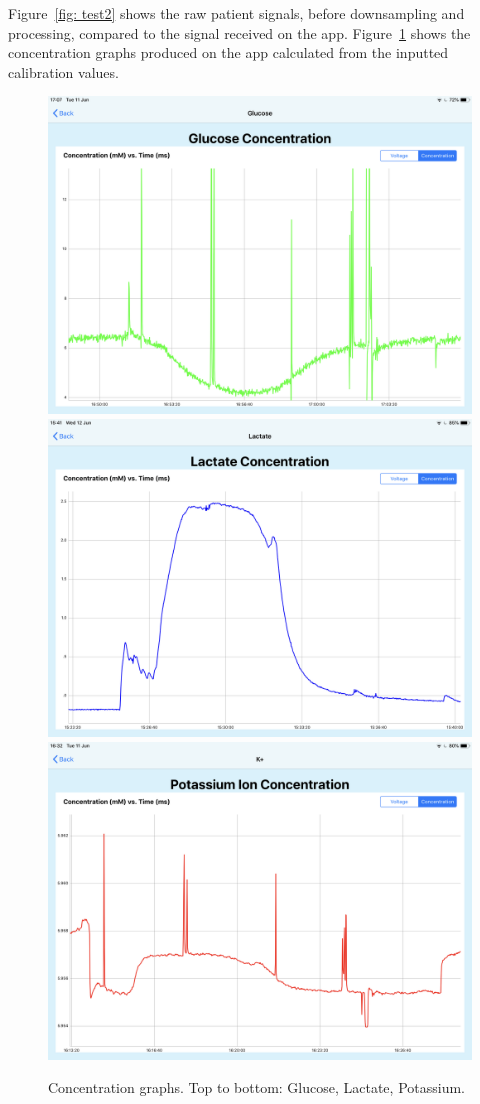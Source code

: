 Figure~\ref{fig: test2} shows the raw patient signals, before downsampling and processing, compared to the signal received on the app. Figure~\ref{fig: test2 conc} shows the concentration graphs produced on the app calculated from the inputted calibration values.

\begin{figure}[p]
\centering
\includegraphics[trim={1.3cm 1.3cm 1.3cm  10cm}, clip, width=.75\textwidth]{./figures/patientsignals/GlucoseC.PNG}
\bigbreak
\includegraphics[trim={1.3cm 1.3cm 1.3cm  10cm}, clip, width=.75\textwidth]{./figures/patientsignals/LactateC.PNG}
\bigbreak
\includegraphics[trim={1.3cm 1.3cm 1.3cm  10cm}, clip, width=.75\textwidth]{./figures/patientsignals/PotassiumC.PNG}
\captionsetup{justification=centering}
\caption{Concentration graphs. Top to bottom: Glucose, Lactate, Potassium.}
\label{fig: test2 conc}
\end{figure}